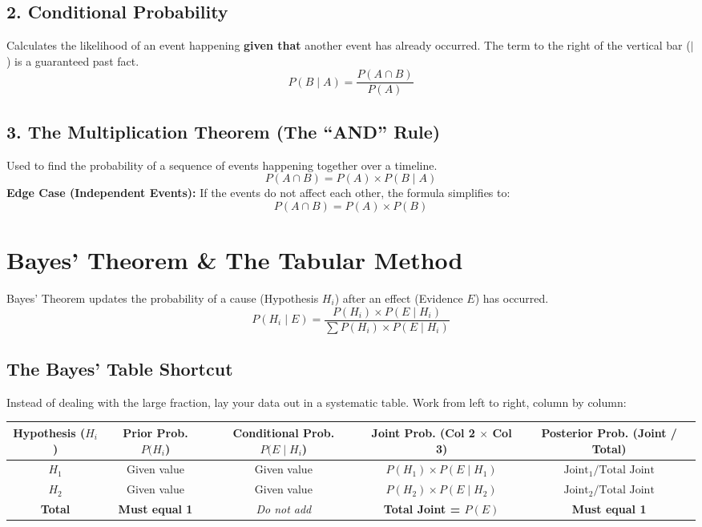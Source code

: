 \documentclass[11pt,a4paper]{article}
\begin{document}
\subsection{2. Conditional Probability}
Calculates the likelihood of an event happening \textbf{given that} another event has already occurred. The term to the right of the vertical bar ($\mid$) is a guaranteed past fact.
\[ P(B \mid A) = \frac{P(A \cap B)}{P(A)} \]

\subsection{3. The Multiplication Theorem (The ``AND'' Rule)}
Used to find the probability of a sequence of events happening together over a timeline.
\[ P(A \cap B) = P(A) \times P(B \mid A) \]
\textbf{Edge Case (Independent Events):} If the events do not affect each other, the formula simplifies to:
\[ P(A \cap B) = P(A) \times P(B) \]

\section{Bayes' Theorem \& The Tabular Method}
Bayes' Theorem updates the probability of a cause (Hypothesis $H_i$) after an effect (Evidence $E$) has occurred. 
\[ P(H_i \mid E) = \frac{P(H_i) \times P(E \mid H_i)}{\sum P(H_i) \times P(E \mid H_i)} \]

\subsection{The Bayes' Table Shortcut}
Instead of dealing with the large fraction, lay your data out in a systematic table. Work from left to right, column by column:

\begin{table}[h]
\centering
\begin{tabular}{ccccc}
\toprule
\textbf{Hypothesis ($H_i$)} & \textbf{Prior Prob. $P(H_i$)} & \textbf{Conditional Prob. $P(E \mid H_i$)} & \textbf{Joint Prob. (Col 2 $\times$ Col 3)} & \textbf{Posterior Prob. (Joint / Total)} \\ \midrule
$H_1$ & Given value & Given value & $P(H_1) \times P(E \mid H_1)$ & $\text{Joint}_1 / \text{Total Joint}$ \\
$H_2$ & Given value & Given value & $P(H_2) \times P(E \mid H_2)$ & $\text{Joint}_2 / \text{Total Joint}$ \\ \midrule
\textbf{Total} & \textbf{Must equal 1} & \textit{Do not add} & \textbf{Total Joint = $P(E)$} & \textbf{Must equal 1} \\ \bottomrule
\end{tabular}
\end{table}
\end{document}
